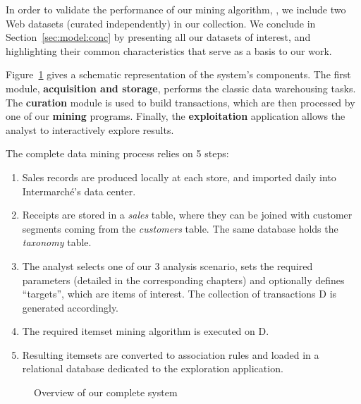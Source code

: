 In order to validate the performance of our mining algorithm, \toppi,
we include two Web datasets (curated independently) in our collection.
We conclude in Section~\ref{sec:model:conc} by presenting all our datasets of interest,
and highlighting their common characteristics
that serve as a basis to our work.



Figure~\ref{fig:archoverview} gives a schematic representation of the system's components.
The first module, \textbf{acquisition and storage}, performs the classic data warehousing tasks.
The \textbf{curation} module is used to build transactions,
which are then processed by one of our \textbf{mining} programs.
Finally, the \textbf{exploitation} application allows the analyst to interactively explore results.

The complete data mining process relies on 5 steps:
\begin{enumerate}
	\item Sales records are produced locally at each store, and imported daily into
		Intermarch\'e's data center.
	\item Receipts are stored in a \textit{sales} table, where they can be
		joined with customer segments coming from the \textit{customers} table.
		The same database holds the \textit{taxonomy} table.
	\item The analyst selects one of our 3 analysis scenario,
		sets the required parameters (detailed in the corresponding chapters) and
		optionally defines ``targets'', which are items of interest.
	The collection of transactions {\mf D} is generated accordingly.
	\item The required itemset mining algorithm is executed on {\mf D}.
	\item Resulting itemsets are converted to association rules
		and loaded in a relational database dedicated to the exploration application.
\end{enumerate}

\vfill
{
	\begin{figure}
		\begin{minipage}{\textwidth}
			
		\end{minipage}
		\centering
		\caption{\label{fig:archoverview}
			Overview of our complete system
		}
	\end{figure}
\restoregeometry
}



